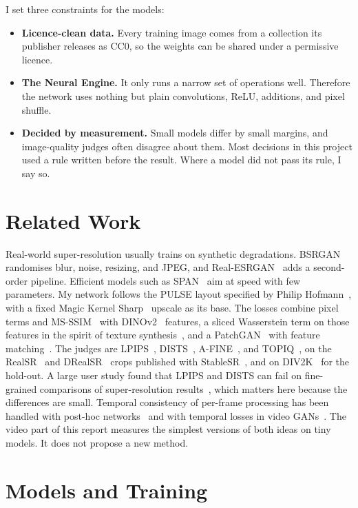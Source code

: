 \documentclass[conference]{IEEEtran}
\begin{document}
I set three constraints for the models:
\begin{itemize}
\item \textbf{Licence-clean data.} Every training image comes from a collection its publisher releases as CC0, so the
  weights can be shared under a permissive licence.
\item \textbf{The Neural Engine.} It only runs a narrow set of operations well. Therefore the network uses nothing but
  plain convolutions, ReLU, additions, and pixel shuffle.
\item \textbf{Decided by measurement.} Small models differ by small margins, and image-quality judges often disagree
  about them. Most decisions in this project used a rule written before the result. Where a model did not pass its
  rule, I say so.
\end{itemize}

\section{Related Work}

Real-world super-resolution usually trains on synthetic degradations. BSRGAN~\cite{bsrgan} randomises blur, noise,
resizing, and JPEG, and Real-ESRGAN~\cite{realesrgan} adds a second-order pipeline. Efficient models such as
SPAN~\cite{span} aim at speed with few parameters. My network follows the PULSE layout specified by Philip
Hofmann~\cite{pulse}, with a fixed Magic Kernel Sharp~\cite{mks} upscale as its base. The losses combine pixel terms
and MS-SSIM~\cite{msssim} with DINOv2~\cite{dinov2} features, a sliced Wasserstein term on those features in the
spirit of texture synthesis~\cite{sliced}, and a PatchGAN~\cite{pix2pix} with feature matching~\cite{improvedgan}. The
judges are LPIPS~\cite{lpips}, DISTS~\cite{dists}, A-FINE~\cite{afine}, and TOPIQ~\cite{topiq}, on the
RealSR~\cite{realsr} and DRealSR~\cite{drealsr} crops published with StableSR~\cite{stablesr}, and on
DIV2K~\cite{div2k} for the hold-out. A large user study found that LPIPS and DISTS can fail on fine-grained
comparisons of super-resolution results~\cite{su}, which matters here because the differences are small. Temporal
consistency of per-frame processing has been handled with post-hoc networks~\cite{lai} and with temporal losses in
video GANs~\cite{tecogan}. The video part of this report measures the simplest versions of both ideas on tiny models.
It does not propose a new method.

\section{Models and Training}
\end{document}
